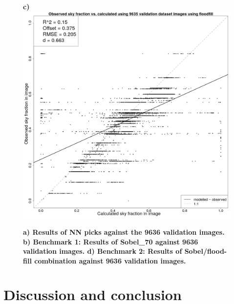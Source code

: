 \documentclass[final,3p,times,authoryear]{elsarticle}
\begin{document}
\begin{figure}
\textbf{c)}\includegraphics[scale=0.15]{Images/ErrorPlots2FloodfillValidation.png}
\caption{\textbf{
a) Results of NN picks against the 9636 validation images. b) Benchmark 1: Results of Sobel\_70 against 9636 validation images.
d) Benchmark 2: Results of Sobel/flood-fill combination against 9636 validation images.}}
\label{fig:errorfloodall}
\end{figure}


\section{Discussion and conclusion}\label{sec:conclusion}
\end{document}
